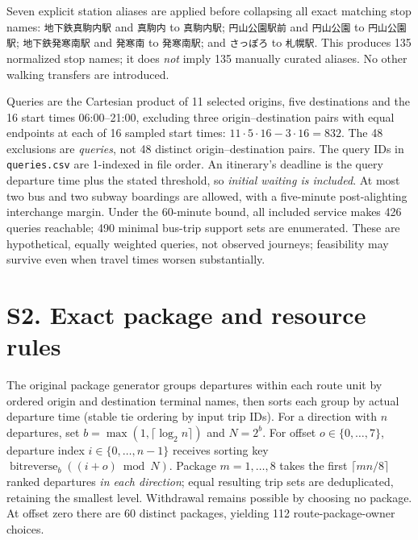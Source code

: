\documentclass[10pt]{article}
\newcommand{\st}[1]{\texttt{\footnotesize #1}}
\begin{document}
Seven explicit station aliases are applied before collapsing all exact matching stop names: \st{地下鉄真駒内駅} and \st{真駒内} to \st{真駒内駅}; \st{円山公園駅前} and \st{円山公園} to \st{円山公園駅}; \st{地下鉄発寒南駅} and \st{発寒南} to \st{発寒南駅}; and \st{さっぽろ} to \st{札幌駅}. This produces 135 normalized stop names; it does \emph{not} imply 135 manually curated aliases. No other walking transfers are introduced.

Queries are the Cartesian product of 11 selected origins, five destinations and the 16 start times 06:00--21:00, excluding three origin--destination pairs with equal endpoints at each of 16 sampled start times: $11\cdot5\cdot16-3\cdot16=832$. The 48 exclusions are \emph{queries}, not 48 distinct origin--destination pairs. The query IDs in \st{queries.csv} are 1-indexed in file order. An itinerary's deadline is the query departure time plus the stated threshold, so \emph{initial waiting is included}. At most two bus and two subway boardings are allowed, with a five-minute post-alighting interchange margin. Under the 60-minute bound, all included service makes 426 queries reachable; 490 minimal bus-trip support sets are enumerated. These are hypothetical, equally weighted queries, not observed journeys; feasibility may survive even when travel times worsen substantially.

\section*{S2. Exact package and resource rules}
The original package generator groups departures within each route unit by ordered origin and destination terminal names, then sorts each group by actual departure time (stable tie ordering by input trip IDs). For a direction with $n$ departures, set $b=\max(1,\lceil\log_2 n\rceil)$ and $N=2^b$. For offset $o\in\{0,\dots,7\}$, departure index $i\in\{0,\dots,n-1\}$ receives sorting key $\operatorname{bitreverse}_b((i+o)\bmod N)$. Package $m=1,\ldots,8$ takes the first $\lceil mn/8\rceil$ ranked departures \emph{in each direction}; equal resulting trip sets are deduplicated, retaining the smallest level. Withdrawal remains possible by choosing no package. At offset zero there are 60 distinct packages, yielding 112 route-package-owner choices.
\end{document}
